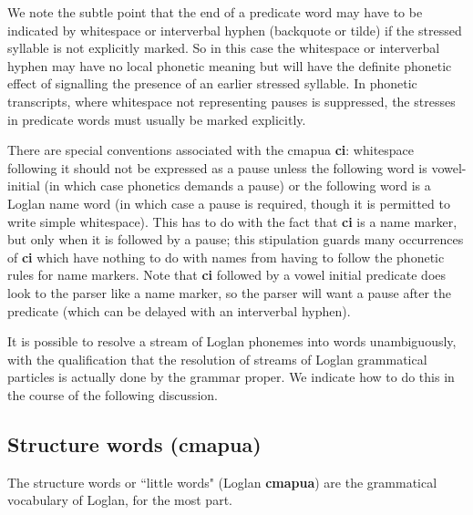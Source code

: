 \documentclass[12pt]{book}
\begin{document}
We note the subtle point that the end of a predicate word may have to be indicated by whitespace or interverbal hyphen (backquote or tilde)  if the stressed syllable is not explicitly marked.  So in this case the whitespace or interverbal hyphen may have no local phonetic meaning but will have the definite phonetic effect of signalling the presence of an earlier stressed syllable.  In phonetic transcripts, where whitespace not representing  pauses is suppressed, the stresses in predicate words must usually be marked explicitly.

There are special conventions associated with the cmapua {\bf ci}:  whitespace following it should not be expressed as a pause unless the following word is vowel-initial (in which case phonetics demands a pause) or the following word is a Loglan name word (in which case a pause is required, though it is permitted to write simple whitespace).  This has to do with the fact that {\bf ci} is a name marker, but only when it is followed by a pause; this stipulation guards many occurrences of {\bf ci} which have nothing to do with names from having to follow the phonetic rules for name markers.  Note that
{\bf ci} followed by a vowel initial predicate does look to the parser like a name marker, so the parser will want a pause after the predicate (which can be delayed with an interverbal hyphen).

It is possible to resolve a stream of Loglan phonemes into words unambiguously, with the qualification that the resolution of streams of Loglan grammatical particles is actually done by the grammar proper.  We indicate how to do this in the course of the following discussion.

\subsection{Structure words (cmapua)}

The structure words or ``little words" (Loglan {\bf cmapua}) are the grammatical vocabulary of Loglan, for the most part.
\end{document}
